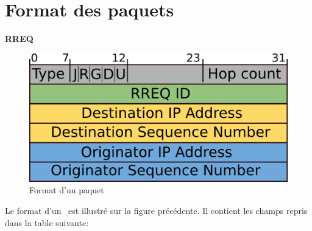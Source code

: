     \section{Format des paquets}
        \textbf{RREQ}\\
            \begin{figure}[H]
                \centering
                \includegraphics[scale=0.5]{images/rreq.png}
                \caption{Format d'un paquet \rreq\ \cite{aodv_w}}
                \label{rreqPaquet}
            \end{figure}
            Le format d'un \rreq\ est illustré sur la figure précédente. Il contient les champs
            repris dans la table suivante:\\

